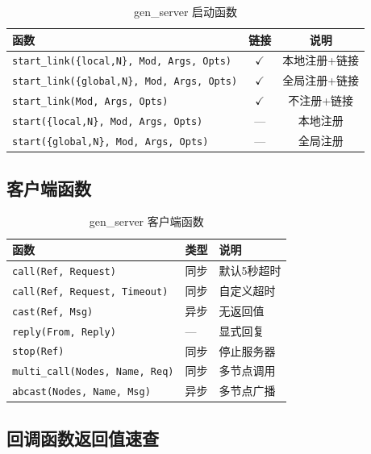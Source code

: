 \documentclass[a4paper,11pt]{article}
\begin{document}
\begin{table}[H]
\centering
\small
\begin{tabular}{@{}lcc@{}}
\toprule
\textbf{函数} & \textbf{链接} & \textbf{说明} \\
\midrule
\texttt{start\_link(\{local,N\}, Mod, Args, Opts)} & $\checkmark$ & 本地注册+链接 \\
\texttt{start\_link(\{global,N\}, Mod, Args, Opts)} & $\checkmark$ & 全局注册+链接 \\
\texttt{start\_link(Mod, Args, Opts)} & $\checkmark$ & 不注册+链接 \\
\texttt{start(\{local,N\}, Mod, Args, Opts)} & --- & 本地注册 \\
\texttt{start(\{global,N\}, Mod, Args, Opts)} & --- & 全局注册 \\
\bottomrule
\end{tabular}
\caption{gen\_server 启动函数}
\end{table}

\subsection{客户端函数}

\begin{table}[H]
\centering
\small
\begin{tabular}{@{}llp{5.5cm}@{}}
\toprule
\textbf{函数} & \textbf{类型} & \textbf{说明} \\
\midrule
\texttt{call(Ref, Request)} & 同步 & 默认5秒超时 \\
\texttt{call(Ref, Request, Timeout)} & 同步 & 自定义超时 \\
\texttt{cast(Ref, Msg)} & 异步 & 无返回值 \\
\texttt{reply(From, Reply)} & --- & 显式回复 \\
\texttt{stop(Ref)} & 同步 & 停止服务器 \\
\texttt{multi\_call(Nodes, Name, Req)} & 同步 & 多节点调用 \\
\texttt{abcast(Nodes, Name, Msg)} & 异步 & 多节点广播 \\
\bottomrule
\end{tabular}
\caption{gen\_server 客户端函数}
\end{table}

\subsection{回调函数返回值速查}
\end{document}

